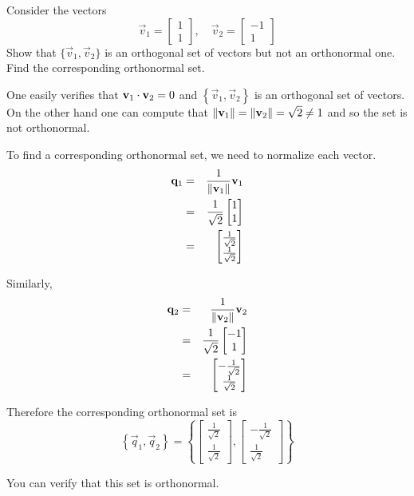 \documentclass{ximera}
\begin{document}
\begin{example}\label{ex:orthonormalset}
Consider the vectors
\[
\vec{v}_1=\begin{bmatrix}
1 \\
1
\end{bmatrix},\quad \vec{v}_2  =
\begin{bmatrix}
-1 \\
1
\end{bmatrix}
\]
Show that $\{\vec{v}_1,\vec{v}_2\}$ is an orthogonal set of vectors  but not an orthonormal one. Find the corresponding orthonormal set.

\begin{explanation}
One easily verifies that $\mathbf{v}_1 \cdot \mathbf{v}_2 = 0$ and
$\left\{ \vec{v}_1, \vec{v}_2 \right\}$ is an orthogonal set of
vectors. On the other hand one can compute that ${\left\lVert\mathbf{v}_1\right\rVert}= {\left\lVert\mathbf{v}_2\right\rVert} =
\sqrt{2} \neq 1$ and so the set is not orthonormal.

To find a corresponding orthonormal set, we need to
normalize each vector. 
\begin{eqnarray*}
\mathbf{q}_1 &=& \frac{1}{\left\lVert\mathbf{v}_1\right\rVert}\mathbf{v}_1\\
&=& \frac{1}{\sqrt{2}} \begin{bmatrix}
1 \\
1
\end{bmatrix} \\
&=&
\begin{bmatrix}
\frac{1}{\sqrt{2}} \\
\frac{1}{\sqrt{2}}
\end{bmatrix}
\end{eqnarray*}

Similarly,
\begin{eqnarray*}
\mathbf{q}_2 &=& \frac{1}{\left\lVert\mathbf{v}_2\right\rVert}\mathbf{v}_2\\
&=& \frac{1}{\sqrt{2}} \begin{bmatrix}
-1 \\
1
\end{bmatrix} \\
&=&
\begin{bmatrix}
-\frac{1}{\sqrt{2}} \\
\frac{1}{\sqrt{2}}
\end{bmatrix}
\end{eqnarray*}

Therefore the corresponding orthonormal set is
\[
\left\{ \vec{q}_1, \vec{q}_2 \right\} =
\left\{
\begin{bmatrix}
\frac{1}{\sqrt{2}} \\
\frac{1}{\sqrt{2}}
\end{bmatrix},
\begin{bmatrix}
-\frac{1}{\sqrt{2}} \\
\frac{1}{\sqrt{2}}
\end{bmatrix}
\right\}
\]

You can verify that this set is orthonormal.
\end{explanation}
\end{example}
\end{document}
